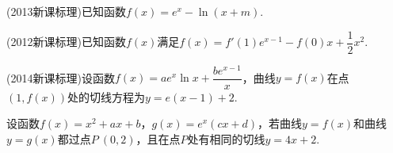 \documentclass{BHCexam}
\begin{document}
\begin{questions}
\kongbai
\question
(2013新课标理)已知函数$f(x)=e^x-\ln (x+m)$.
\kongbai
\question
(2012新课标理)已知函数$f(x)$满足$f(x)=f'(1)e^{x-1}-f(0)x+\dfrac{1}{2}x^2$.
\kongbai
\question
(2014新课标理)设函数$f(x)=ae^x\ln x+\dfrac{be^{x-1}}{x}$，曲线$y=f(x)$在点$(1,f(x))$处的切线方程为$y=e(x-1)+2$.
\kongbai
\question
设函数$f(x)=x^2+ax+b$，$g(x)=e^x(cx+d)$，若曲线$y=f(x)$和曲线$y=g(x)$都过点$P~(0,2)$，且在点$P$处有相同的切线$y=4x+2$.
\end{questions}
\end{document}
